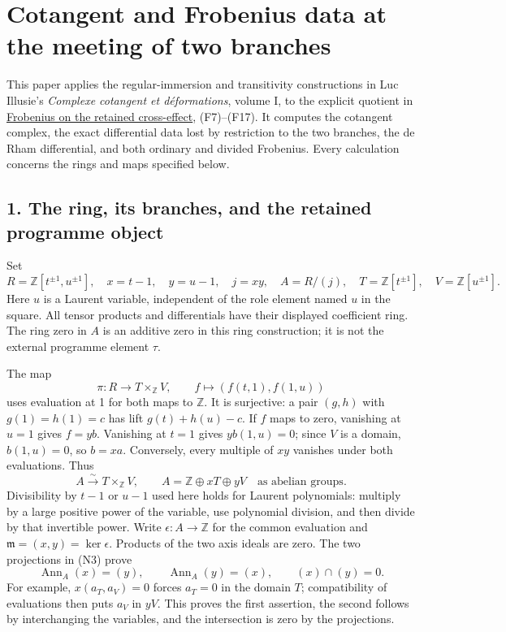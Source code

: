 \documentclass[
]{article}
\author{}
\date{}
\begin{document}
{
\setcounter{tocdepth}{3}
\tableofcontents
}
\section{Cotangent and Frobenius data at the meeting of two
branches}\label{cotangent-and-frobenius-data-at-the-meeting-of-two-branches}

This paper applies the regular-immersion and transitivity constructions
in Luc Illusie's \emph{Complexe cotangent et déformations}, volume I, to
the explicit quotient in
\href{https://github.com/KokunoYumeto/zeta-function-research-reader/blob/6af54ea3c8ef99127af327f3103e086c68d482c2/workbenches/splitzero-tandem/branches/identity-absorber-square/FROBENIUS_CROSS_EFFECT.md}{Frobenius
on the retained cross-effect}, (F7)--(F17). It computes the cotangent
complex, the exact differential data lost by restriction to the two
branches, the de Rham differential, and both ordinary and divided
Frobenius. Every calculation concerns the rings and maps specified
below.

\subsection{1. The ring, its branches, and the retained programme
object}\label{the-ring-its-branches-and-the-retained-programme-object}

Set \[
R=\mathbb Z[t^{\pm1},u^{\pm1}],\quad x=t-1,\quad y=u-1,
\quad j=xy,\quad A=R/(j),
\quad T=\mathbb Z[t^{\pm1}],\quad V=\mathbb Z[u^{\pm1}].
\tag{N1}
\] Here \(u\) is a Laurent variable, independent of the role element
named \(u\) in the square. All tensor products and differentials have
their displayed coefficient ring. The ring zero in \(A\) is an additive
zero in this ring construction; it is not the external programme element
\(\tau\).

The map \[
\pi:R\longrightarrow T\times_{\mathbb Z}V,
\qquad f\longmapsto(f(t,1),f(1,u))
\tag{N2}
\] uses evaluation at 1 for both maps to \(\mathbb Z\). It is
surjective: a pair \((g,h)\) with \(g(1)=h(1)=c\) has lift
\(g(t)+h(u)-c\). If \(f\) maps to zero, vanishing at \(u=1\) gives
\(f=yb\). Vanishing at \(t=1\) gives \(yb(1,u)=0\); since \(V\) is a
domain, \(b(1,u)=0\), so \(b=xa\). Conversely, every multiple of \(xy\)
vanishes under both evaluations. Thus \[
A\xrightarrow{\sim}T\times_{\mathbb Z}V,
\qquad A=\mathbb Z\oplus xT\oplus yV
\quad\text{as abelian groups}.
\tag{N3}
\] Divisibility by \(t-1\) or \(u-1\) used here holds for Laurent
polynomials: multiply by a large positive power of the variable, use
polynomial division, and then divide by that invertible power. Write
\(\epsilon:A\to\mathbb Z\) for the common evaluation and
\(\mathfrak m=(x,y)=\ker\epsilon\). Products of the two axis ideals are
zero. The two projections in (N3) prove \[
\operatorname{Ann}_A(x)=(y),\qquad
\operatorname{Ann}_A(y)=(x),\qquad (x)\cap(y)=0.
\tag{N4}
\] For example, \(x(a_T,a_V)=0\) forces \(a_T=0\) in the domain \(T\);
compatibility of evaluations then puts \(a_V\) in \(yV\). This proves
the first assertion, the second follows by interchanging the variables,
and the intersection is zero by the projections.
\end{document}
